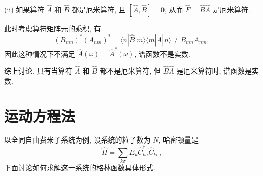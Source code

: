 \begin{note}
        (ii) 如果算符 $\hat{A}$ 和 $\hat{B}$ 都是厄米算符, 且 $\left[ \hat{A},\hat{B} \right]=0$, 从而 $\hat{F}=\hat{B}\hat{A}$ 是厄米算符.

        此时考虑算符矩阵元的乘积, 有
        \begin{equation}
            (B_{mn})^* (A_{nm})^*=\langle n|\hat{B}|m \rangle \langle m|\hat{A}|n \rangle\ne B_{mn}A_{nm},
        \end{equation}
        因此这种情况下不满足 $\hat{A}(\omega)=\hat{A}^*(\omega)$, 谱函数不是实数.

        综上讨论, 只有当算符 $\hat{A}$ 和 $\hat{B}$ 都不是厄米算符, 但 $\hat{B}\hat{A}$ 是厄米算符时, 谱函数是实数.
    \end{note}

\section{运动方程法}
以全同自由费米子系统为例, 设系统的粒子数为 $N$, 哈密顿量是
\begin{equation}
    \hat{H}=\sum_{k\sigma}E^{}_k\hat{C}_{k\sigma}^\dagger \hat{C}_{k\sigma}^{ },
\end{equation}
下面讨论如何求解这一系统的格林函数具体形式. 

